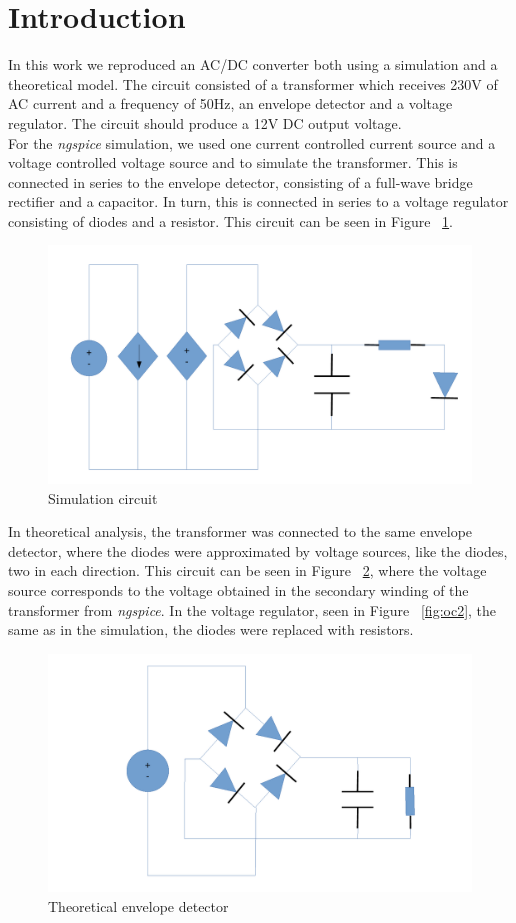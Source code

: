 \section{Introduction}
\label{sec : intro}
In this work we reproduced an AC/DC converter both using a simulation and a theoretical model. The circuit consisted of a transformer which receives 230V of AC current and a frequency of 50Hz, an envelope detector and a voltage regulator. The circuit should produce a 12V DC output voltage. \\
For the \textit{ngspice} simulation, we used one current controlled current source and a voltage controlled voltage source and  to simulate the transformer. This is connected in series to the envelope detector, consisting of a full-wave bridge rectifier and a capacitor. In turn, this is connected in series to a voltage regulator consisting of diodes and a resistor. This circuit can be seen in Figure ~\ref{fig:circngspice}.\\
\begin{figure}[H] \centering
\includegraphics[width=0.8\linewidth]{circngspice.pdf}
\caption{Simulation circuit}
\label{fig:circngspice}
\end{figure} 
In theoretical analysis, the transformer was connected to the same envelope detector, where the diodes were approximated by voltage sources, like the diodes, two in each direction. This circuit can be seen in Figure ~\ref{fig:oc1}, where the voltage source corresponds to the voltage obtained in the secondary winding of the transformer from \textit{ngspice}. In the voltage regulator, seen in Figure ~\ref{fig:oc2}, the same as in the simulation, the diodes were replaced with resistors.\\
\begin{figure}[H] \centering
\includegraphics[width=0.8\linewidth]{octave1.pdf}
\caption{Theoretical envelope detector}
\label{fig:oc1}
\end{figure} 

